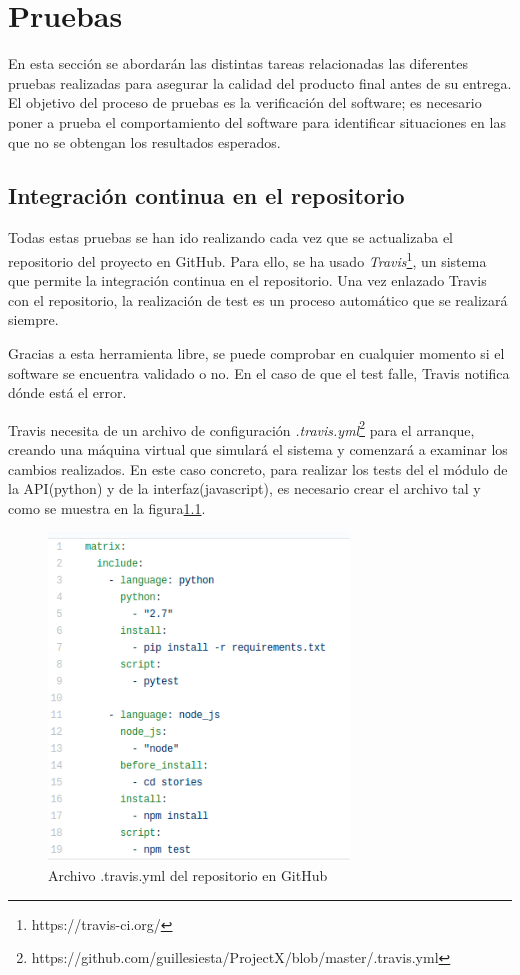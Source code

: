 \chapter{Pruebas}

En esta sección se abordarán las distintas tareas relacionadas las diferentes pruebas realizadas para asegurar la calidad del producto final antes de su entrega. El objetivo del proceso de pruebas es la verificación del software; es necesario poner a prueba el comportamiento del software para identificar situaciones en las que no se obtengan los resultados esperados.

\section{Integración continua en el repositorio}

Todas estas pruebas se han ido realizando cada vez que se actualizaba el repositorio del proyecto en GitHub. Para ello, se ha usado \textit{Travis}\footnote{https://travis-ci.org/}, un sistema que permite la integración continua en el repositorio. Una vez enlazado Travis con el repositorio, la realización de test es un proceso automático que se realizará siempre.

Gracias a esta herramienta libre, se puede comprobar en cualquier momento si el software se encuentra validado o no. En el caso de que el test falle, Travis notifica dónde está el error. 

Travis necesita de un archivo de configuración \textit{.travis.yml}\footnote{https://github.com/guillesiesta/ProjectX/blob/master/.travis.yml} para el arranque, creando una máquina virtual que simulará el sistema y comenzará a examinar los cambios realizados. En este caso concreto, para realizar los tests del  el módulo de la API(python) y de  la interfaz(javascript), es necesario crear el archivo tal y como se muestra en la figura\ref{fig::travis}.

\begin{figure}[htbp]
    \centerline{\includegraphics[width=8cm]{figuras/travis.png}}
    \caption{Archivo .travis.yml del repositorio en GitHub}
    \label{fig::travis}
\end{figure}

